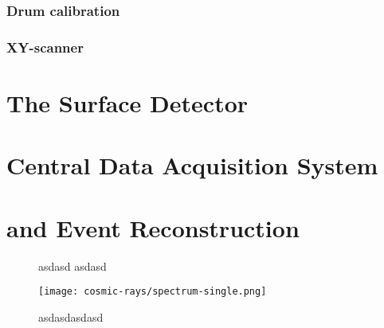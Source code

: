 \subsubsection{Drum calibration}
\subsubsection{XY-scanner}

\section{The Surface Detector}
\label{sec:sd}


\section{Central Data Acquisition System}
\label{sec:cdas}



\section{\Offline and Event Reconstruction}
\label{sec:rec}

\begin{figure}[t]
  \centering
  \hspace{0.2cm}
  \caption[]{ asdasd  asdasd}
  \label{fig:}
\end{figure}

\begin{figure}[t]
  \centering
  \texttt{[image: cosmic-rays/spectrum-single.png]}
  \caption{asdasdasdasd}
  \label{fig:asdasd}
\end{figure}



